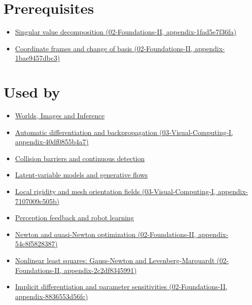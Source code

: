 \section{Prerequisites}\label{appendix-29f4bea4c2bb-prerequisites}

\begin{itemize}
\tightlist
\item
  \href{../02-Foundations-II/main.pdf\#nameddest=appendix-1fad5e7f36fa}{Singular value decomposition (02-Foundations-II, appendix-1fad5e7f36fa)}
\item
  \href{../02-Foundations-II/main.pdf\#nameddest=appendix-1bae9457dbc3}{Coordinate frames and change of basis (02-Foundations-II, appendix-1bae9457dbc3)}
\end{itemize}

\section{Used by}\label{appendix-29f4bea4c2bb-used-by}

\begin{itemize}
\item
  \href{Continuous\%20Notes/University\%20-\%20Worlds,\%20Images\%20and\%20Inference\%20-\%20Graphics,\%20Vision\%20and\%20Photography}{Worlds, Images and Inference}
\item
  \href{../03-Visual-Computing-I/main.pdf\#nameddest=appendix-40df0855b4a7}{Automatic differentiation and backpropagation (03-Visual-Computing-I, appendix-40df0855b4a7)}
\item
  \hyperref[appendix-a9ba01fa72a6]{Collision barriers and continuous detection}
\item
  \hyperref[appendix-2c568f05ee34]{Latent-variable models and generative flows}
\item
  \href{../03-Visual-Computing-I/main.pdf\#nameddest=appendix-7107009c505b}{Local rigidity and mesh orientation fields (03-Visual-Computing-I, appendix-7107009c505b)}
\item
  \hyperref[appendix-b0c42da325f1]{Perception feedback and robot learning}
\item
  \href{../02-Foundations-II/main.pdf\#nameddest=appendix-54c8f5828387}{Newton and quasi-Newton optimization (02-Foundations-II, appendix-54c8f5828387)}
\item
  \href{../02-Foundations-II/main.pdf\#nameddest=appendix-2c2df8345991}{Nonlinear least squares: Gauss-Newton and Levenberg-Marquardt (02-Foundations-II, appendix-2c2df8345991)}
\item
  \href{../02-Foundations-II/main.pdf\#nameddest=appendix-8836553d56fc}{Implicit differentiation and parameter sensitivities (02-Foundations-II, appendix-8836553d56fc)}
\end{itemize}

